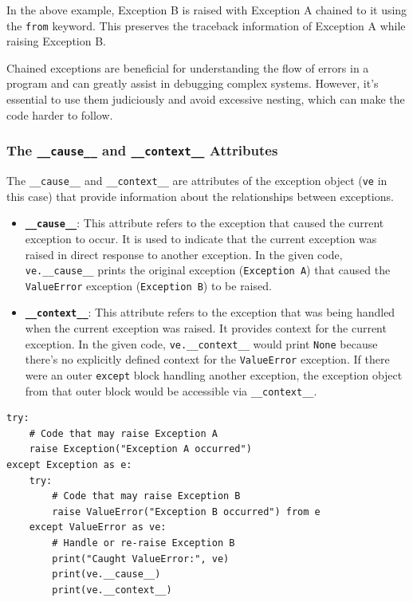 In the above example, Exception B is raised with Exception A chained to it using the \texttt{from} keyword. This preserves the traceback information of Exception A while raising Exception B.

Chained exceptions are beneficial for understanding the flow of errors in a program and can greatly assist in debugging complex systems. However, it's essential to use them judiciously and avoid excessive nesting, which can make the code harder to follow.

\newpage
\subsubsection{The \texttt{\_\_cause\_\_} and \texttt{\_\_context\_\_} Attributes}
The \texttt{\_\_cause\_\_} and \texttt{\_\_context\_\_} are attributes of the exception object (\texttt{ve} in this case) that provide information about the relationships between exceptions.

\begin{itemize}
    \item \textbf{\texttt{\_\_cause\_\_}}: This attribute refers to the exception that caused the current exception to occur. It is used to indicate that the current exception was raised in direct response to another exception. In the given code, \texttt{ve.\_\_cause\_\_} prints the original exception (\texttt{Exception A}) that caused the \texttt{ValueError} exception (\texttt{Exception B}) to be raised.
    
    \item \textbf{\texttt{\_\_context\_\_}}: This attribute refers to the exception that was being handled when the current exception was raised. It provides context for the current exception. In the given code, \texttt{ve.\_\_context\_\_} would print \texttt{None} because there's no explicitly defined context for the \texttt{ValueError} exception. If there were an outer \texttt{except} block handling another exception, the exception object from that outer block would be accessible via \texttt{\_\_context\_\_}.
\end{itemize}


\begin{codebox}
\begin{verbatim}
try:
    # Code that may raise Exception A
    raise Exception("Exception A occurred")
except Exception as e:
    try:
        # Code that may raise Exception B
        raise ValueError("Exception B occurred") from e
    except ValueError as ve:
        # Handle or re-raise Exception B
        print("Caught ValueError:", ve)
        print(ve.__cause__)
        print(ve.__context__)
\end{verbatim}
\end{codebox}


